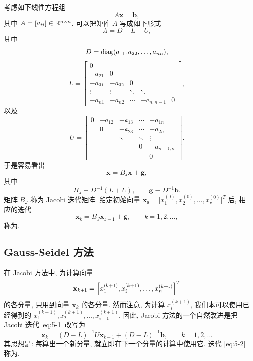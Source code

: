 考虑如下线性方程组
\[
  A\mathbf{x}=\mathbf{b},
\]
其中 $A=[a_{ij}]\in\mathbb{R}^{n\times n}$. 可以把矩阵 $A$ 写成如下形式
\[
  A=D-L-U,
\]
其中
\[
  D=\operatorname{diag}(a_{11},a_{22},\ldots,a_{nn}),
\]
\[
  L=
  \begin{bmatrix}
    0 & & & & \\
    -a_{21} & 0 & & & \\
    -a_{31} & -a_{32} & 0 & & \\
    \vdots & \vdots & \ddots & \ddots & \\
    -a_{n1} & -a_{n2} & \cdots & -a_{n,n-1} & 0
  \end{bmatrix},
\]
以及
\[
  U=
  \begin{bmatrix}
    0 & -a_{12} & -a_{13} & \cdots & -a_{1n}\\
      & 0 & -a_{23} & \cdots & -a_{2n}\\
      & & \ddots & \ddots & \vdots\\
      & & & 0 & -a_{n-1,n}\\
      & & & & 0
  \end{bmatrix}.
\]
于是容易看出
\[
  \mathbf{x}=B_J\mathbf{x}+\mathbf{g},
\]
其中
\[
  B_J=D^{-1}(L+U),\qquad \mathbf{g}=D^{-1}\mathbf{b}.
\]
矩阵 $B_J$ 称为 Jacobi 迭代矩阵. 给定初始向量 $\mathbf{x}_0=\bigl[x_1^{(0)},x_2^{(0)},\ldots,x_n^{(0)}\bigr]^T$ 后, 相应的迭代
\begin{equation}
  \mathbf{x}_k=B_J\mathbf{x}_{k-1}+\mathbf{g},\qquad k=1,2,\ldots,
  \label{eq:5-1}
\end{equation}
称为.

\subsection{Gauss-Seidel 方法}
\label{subsec:5-1-2}

在 Jacobi 方法中, 为计算向量
\[
  \mathbf{x}_{k+1}=\Bigl[x_1^{(k+1)},x_2^{(k+1)},\ldots,x_n^{(k+1)}\Bigr]^T
\]
的各分量, 只用到向量 $\mathbf{x}_k$ 的各分量. 然而注意, 为计算 $x_i^{(k+1)}$, 我们本可以使用已经得到的 $x_1^{(k+1)},x_2^{(k+1)},\ldots,x_{i-1}^{(k+1)}$. 因此, Jacobi 方法的一个自然改进是把 Jacobi 迭代 \eqref{eq:5-1} 改写为
\begin{equation}
  \mathbf{x}_k=(D-L)^{-1}U\mathbf{x}_{k-1}+(D-L)^{-1}\mathbf{b},\qquad k=1,2,\ldots
  \label{eq:5-2}
\end{equation}
其思想是: 每算出一个新分量, 就立即在下一个分量的计算中使用它. 迭代 \eqref{eq:5-2} 称为.

